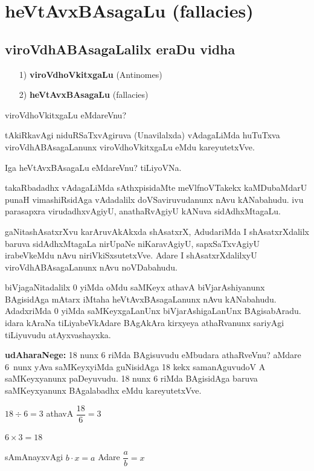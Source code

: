\chapter{heVtAvxBAsagaLu {\rm (fallacies)}}

\section*{viroVdhABAsagaLalilx eraDu vidha}

\begin{itemize}
\item[{\rm 1)}] {\bf viroVdhoVkitxgaLu} {\rm (Antinomes)}
\item[{\rm 2)}] {\bf heVtAvxBAsagaLu} {\rm (fallacies)}
\end{itemize}

viroVdhoVkitxgaLu eMdareVnu?

tAkiRkavAgi niduRSaTxvAgiruva (Unavilalxda) vAdagaLiMda huTuTxva viroVdhA\-BAsagaLanunx viroVdhoVkitxgaLu eMdu kareyutetxVve.

Iga heVtAvxBAsagaLu eMdareVnu? tiLiyoVNa.

takaRbadadhx vAdagaLiMda sAthxpisidaMte meVlfnoVTakekx kaMDubaMdarU punaH vimashiRsidAga vAdadalilx doVSaviruvudanunx nAvu kANabahudu. ivu parasapxra virudadhxvAgiyU, anathaRvAgiyU kANuva sidAdhxMtagaLu.

gaNitashAsatxrXvu karAruvAkAkxda shAsatxrX, AdudariMda I shAsatxrXdalilx baruva sidAdhxMta\-gaLa nirUpaNe niKaravAgiyU, sapxSaTxvAgiyU irabeVkeMdu nAvu niriVkiSxsutetxVve. Adare I shAsatxrXdalilxyU viroVdhABAsagaLanunx nAvu noVDabahudu.

biVjagaNitadalilx {\rm 0} yiMda oMdu saMKeyx athavA biVjarAshiyanunx BAgisidAga mAtarx iMtaha heVtAvxBAsagaLanunx nAvu kANabahudu. AdadxriMda {\rm 0} yiMda saMKeyxgaLanUnx biVjarAshigaLanUnx BAgisabAradu. idara kAraNa tiLiyabeVkAdare BAgAkAra kirxyeya athaRvanunx sariyAgi tiLiyuvudu atAyxvashayxka.

\textbf{udAharaNege:} {\rm 18} nunx {\rm 6} riMda BAgisuvudu eMbudara athaRveVnu? aMdare {\rm 6}~nunx yAva saMKeyxyiMda guNisidAga {\rm 18} kekx samanAguvudoV A saMKeyxyanunx paDeyuvudu. {\rm 18} nunx {\rm 6} riMda BAgisidAga baruva saMKeyxyanunx BAgalabadhx eMdu kareyutetxVve.
\begin{center}
$18\div 6=3$ \quad athavA \quad $\dfrac{18}{6}=3$

$6\times3=18$

sAmAnayxvAgi \quad $b\cdot x=a$ \quad Adare \quad $\dfrac{a}{b}=x$
\end{center}

